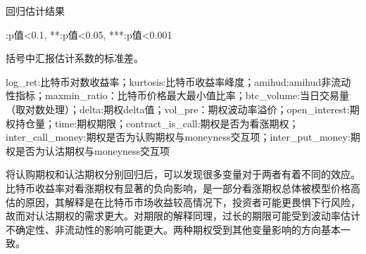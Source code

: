 \begin{center}
    \begin{threeparttable}[H]

        \caption{回归估计结果}

        
        \begin{tablenotes}
            \footnotesize
            \item *:p值<0.1, **:p值<0.05, ***:p值<0.001
            \item 括号中汇报估计系数的标准差。
            \item log\_ret:比特币对数收益率；kurtosis:比特币收益率峰度；amihud:amihud非流动性指标；maxmin\_ratio：比特币价格最大最小值比率；btc\_volume:当日交易量（取对数处理）；delta:期权delta值；vol\_pre：期权波动率溢价；open\_interest:期权持仓量；time:期权期限；contract\_is\_call:期权是否为看涨期权；inter\_call\_money:期权是否为认购期权与moneyness交互项；inter\_put\_money:期权是否为认沽期权与moneyness交互项
        \end{tablenotes}
    \end{threeparttable}
\end{center}
\newpage
\restoregeometry
将认购期权和认沽期权分别回归后，可以发现很多变量对于两者有着不同的效应。比特币收益率对看涨期权有显著的负向影响，是一部分看涨期权总体被模型价格高估的原因，其解释是在比特币市场收益较高情况下，投资者可能更畏惧下行风险，故而对认沽期权的需求更大。对期限的解释同理，过长的期限可能受到波动率估计不确定性、非流动性的影响可能更大。两种期权受到其他变量影响的方向基本一致。
